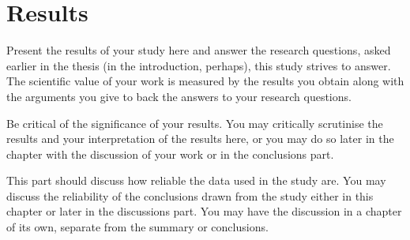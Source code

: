 \section{Results}

Present the results of your study here and answer the research questions, asked 
earlier in the thesis (in the introduction, perhaps), this study strives to 
answer. The scientific value of your work is measured by the results you obtain 
along with the arguments you give to back the answers to your research 
questions.

Be critical of the significance of your results. You may critically scrutinise 
the results and your interpretation of the results here, or you may do so later 
in the chapter with the discussion of your work or in the conclusions part.

This part should discuss how reliable the data used in the study are. You may 
discuss the reliability of the conclusions drawn from the study either in this 
chapter or later in the discussions part. You may have the discussion in a 
chapter of its own, separate from the summary or conclusions.


\clearpage